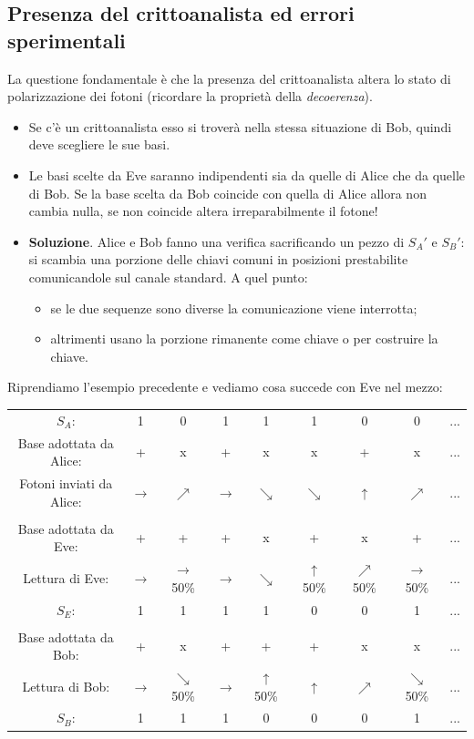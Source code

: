 \subsection{Presenza del crittoanalista ed errori sperimentali}
La questione fondamentale è che la presenza del crittoanalista altera lo stato di polarizzazione dei fotoni (ricordare la proprietà della \emph{decoerenza}). 
\begin{itemize}
	\item Se c'è un crittoanalista esso si troverà nella stessa situazione di Bob, quindi deve scegliere le sue basi.
	\item Le basi scelte da Eve saranno indipendenti sia da quelle di Alice che da quelle di Bob. Se la base scelta da Bob coincide con quella di Alice allora non cambia nulla, se non coincide altera irreparabilmente il fotone!
	\item \textbf{Soluzione}. Alice e Bob fanno una verifica sacrificando un pezzo di $S_A'$ e $S_B'$:
	si scambia una porzione delle chiavi comuni in posizioni prestabilite comunicandole sul canale standard. A quel punto:
	\begin{itemize}
		\item se le due sequenze sono diverse la comunicazione viene interrotta;
		\item altrimenti usano la porzione rimanente come chiave o per costruire la chiave.
	\end{itemize}	
\end{itemize}
Riprendiamo l'esempio precedente e vediamo cosa succede con Eve nel mezzo:
\begin{center}
    \begin{tabular}{c|c c c c c c c c}
        $S_A$: & 1 & 0 & 1 & 1 & 1 & 0 & 0 & ... \\
        Base adottata da Alice: & + & x & + & x & x & + & x & ... \\
        Fotoni inviati da Alice: & $\rightarrow$ & $\nearrow$ & $\rightarrow$ & $\searrow$ & $\searrow$ & $\uparrow$ & $\nearrow$ & ... \\
    
        & & & & & & & & \\

        Base adottata da Eve: & + & + & + & x & + & x & + & ... \\
        Lettura di Eve: & $\rightarrow$ & $\rightarrow$ 50\% & $\rightarrow$ & $\searrow$ & $\uparrow$ 50\% & $\nearrow$ 50\% & $\rightarrow$ 50\% & ... \\
        $S_E$: & 1 & 1 & 1 & 1 & 0 & 0 & 1 & ... \\

        & & & & & & & & \\

        Base adottata da Bob: & + & x & + & + & + & x & x & ... \\
        Lettura di Bob: & $\rightarrow$ & $\searrow$ 50\% & $\rightarrow$ & $\uparrow$ 50\% & $\uparrow$ & $\nearrow$ & $\searrow$ 50\% & ... \\
        $S_B$: & 1 & 1 & 1 & 0 & 0 & 0 & 1 & ... \\
    \end{tabular}
\end{center}
